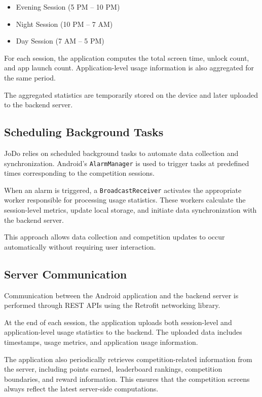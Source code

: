 \documentclass[11pt]{report}
\begin{document}
\begin{itemize}
    \item Evening Session (5 PM -- 10 PM)
    \item Night Session (10 PM -- 7 AM)
    \item Day Session (7 AM -- 5 PM)
\end{itemize}

For each session, the application computes the total screen time, unlock count, 
and app launch count. Application-level usage information is also aggregated for 
the same period.

The aggregated statistics are temporarily stored on the device and later uploaded 
to the backend server.

\subsection{Scheduling Background Tasks}

JoDo relies on scheduled background tasks to automate data collection and synchronization. 
Android's \texttt{AlarmManager} is used to trigger tasks at predefined times corresponding 
to the competition sessions.

When an alarm is triggered, a \texttt{BroadcastReceiver} activates the appropriate worker 
responsible for processing usage statistics. These workers calculate the session-level 
metrics, update local storage, and initiate data synchronization with the backend server.

This approach allows data collection and competition updates to occur automatically 
without requiring user interaction.

\subsection{Server Communication}

Communication between the Android application and the backend server is performed 
through REST APIs using the Retrofit networking library.

At the end of each session, the application uploads both session-level and 
application-level usage statistics to the backend. The uploaded data includes 
timestamps, usage metrics, and application usage information.

The application also periodically retrieves competition-related information from 
the server, including points earned, leaderboard rankings, competition boundaries, 
and reward information. This ensures that the competition screens always reflect 
the latest server-side computations.
\end{document}
